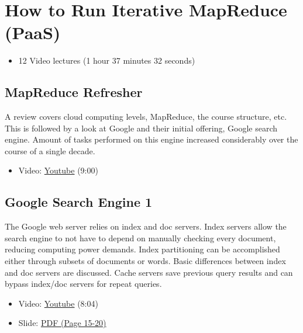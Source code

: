 \FILENAME

\section{How to Run Iterative MapReduce
(PaaS)}\label{how-to-run-iterative-mapreduce-paas}

\begin{itemize}
\tightlist
\item
  12 Video lectures (1 hour 37 minutes 32 seconds)
\end{itemize}

\subsection{MapReduce Refresher}\label{mapreduce-refresher}

A review covers cloud computing levels, MapReduce, the course structure,
etc. This is followed by a look at Google and their initial offering,
Google search engine. Amount of tasks performed on this engine increased
considerably over the course of a single decade.

\begin{itemize}
\tightlist
\item
  Video: \href{https://www.youtube.com/watch?v=0TRTdzgC_N0}{Youtube}
  (9:00)
\end{itemize}

\subsection{Google Search Engine 1}\label{google-search-engine-1}

The Google web server relies on index and doc servers. Index servers
allow the search engine to not have to depend on manually checking every
document, reducing computing power demands. Index partitioning can be
accomplished either through subsets of documents or words. Basic
differences between index and doc servers are discussed. Cache servers
save previous query results and can bypass index/doc servers for repeat
queries.

\begin{itemize}
\tightlist
\item
  Video: \href{https://www.youtube.com/watch?v=S2oT7uMw5Yg}{Youtube}
  (8:04)
\end{itemize}

\begin{itemize}
\tightlist
\item
  Slide:
  \href{https://drive.google.com/open?id=0B88HKpainTSfYWZ0dDlrNThkVms}{PDF
  (Page 15-20)}
\end{itemize}

